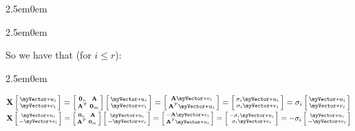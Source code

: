 \documentclass{book}
\newenvironment{myIndent}{%
   \begin{adjustwidth}{2.5em}{0em}%
}{%
   \end{adjustwidth}%
}
\newcommand{\retTwo}{\hfill\bigbreak}
\newcommand{\mVecAst}[1]{\myVector*{#1}}
\newcommand{\mMat}[1]{\mathbf{#1}}
\begin{document}
{\begin{myIndent}
{\begin{myIndent}
         So we have that (for $i \leq r$):\\
         \begin{myIndent}
            $\mMat{X}\left[\begin{smallmatrix}
               \mVecAst{u}_i \\ \mVecAst{v}_i
            \end{smallmatrix}\right] = \left[\begin{smallmatrix}
               \mMat{0}_n & \mMat{A} \\ \mMat{A}^T & \mMat{0}_m
            \end{smallmatrix}\right]\left[\begin{smallmatrix}
               \mVecAst{u}_i \\ \mVecAst{v}_i
            \end{smallmatrix}\right] = \left[\begin{smallmatrix}
               \mMat{A}\mVecAst{v}_i \\ \mMat{A}^T\mVecAst{u}_i
            \end{smallmatrix}\right] = \left[\begin{smallmatrix}
               \sigma_i\mVecAst{u}_i \\ \sigma_i\mVecAst{v}_i
            \end{smallmatrix}\right] = \sigma_i\left[\begin{smallmatrix}
               \mVecAst{u}_i \\ \mVecAst{v}_i
            \end{smallmatrix}\right]$\\

            $\mMat{X}\left[\begin{smallmatrix}
               \mVecAst{u}_i \\ -\mVecAst{v}_i
            \end{smallmatrix}\right] = \left[\begin{smallmatrix}
               \mMat{0}_n & \mMat{A} \\ \mMat{A}^T & \mMat{0}_m
            \end{smallmatrix}\right]\left[\begin{smallmatrix}
               \mVecAst{u}_i \\ -\mVecAst{v}_i
            \end{smallmatrix}\right] = \left[\begin{smallmatrix}
               -\mMat{A}\mVecAst{v}_i \\ \mMat{A}^T\mVecAst{u}_i
            \end{smallmatrix}\right] = \left[\begin{smallmatrix}
               -\sigma_i\mVecAst{u}_i \\ \sigma_i\mVecAst{v}_i
            \end{smallmatrix}\right] = -\sigma_i\left[\begin{smallmatrix}
               \mVecAst{u}_i \\ -\mVecAst{v}_i
            \end{smallmatrix}\right]$\retTwo
         \end{myIndent}
      \end{myIndent}}


\end{myIndent}}
\end{document}
